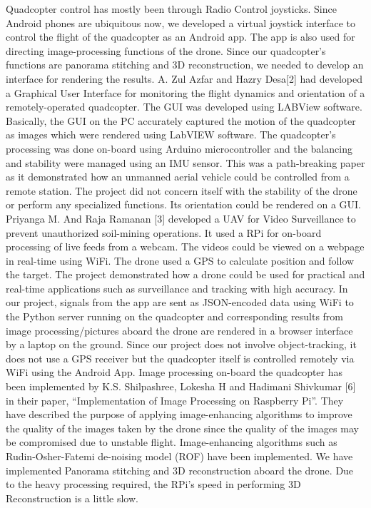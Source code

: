 Quadcopter control has mostly been through Radio Control joysticks. Since Android phones are ubiquitous now, we developed a virtual joystick interface to control the flight of the quadcopter as an Android app. The app is also used for directing image-processing functions of the drone. Since our quadcopter's functions are panorama stitching and 3D reconstruction, we needed to develop an interface for rendering the results.  A. Zul Azfar and Hazry Desa[2] had developed a Graphical User Interface for monitoring the flight dynamics and orientation of a remotely-operated quadcopter. The GUI was developed using LABView software. Basically, the GUI on the PC accurately captured the motion of the quadcopter as images which were rendered using LabVIEW software. The quadcopter’s processing was done on-board using Arduino microcontroller and the balancing and stability were managed using an IMU sensor. This was a path-breaking paper as it demonstrated how an unmanned aerial vehicle could be controlled from a remote station. The project did not concern itself with the stability of the drone or perform any specialized functions. Its orientation could be rendered on a GUI. Priyanga M. And Raja Ramanan [3] developed a UAV for Video Surveillance to prevent unauthorized soil-mining operations. It used a RPi for on-board processing of live feeds from a webcam. The videos could be viewed on a webpage in real-time using WiFi. The drone used a GPS to calculate position and follow the target. The project demonstrated how a drone could be used for practical and real-time applications such as surveillance and tracking with high accuracy. In our project, signals from the app are sent as JSON-encoded data using WiFi to the Python server running on the quadcopter and corresponding results from image processing/pictures aboard the drone are rendered in a browser interface by a laptop on the ground. Since our project does not involve object-tracking, it does not use a GPS receiver but the quadcopter itself is controlled remotely via WiFi using the Android App.
Image processing on-board the quadcopter has been implemented by K.S. Shilpashree, Lokesha H and Hadimani Shivkumar [6] in their paper, “Implementation of Image Processing on Raspberry Pi”. They have described the purpose of applying image-enhancing algorithms to improve the quality of the images taken by the drone since the quality of the images may be compromised due to unstable flight. Image-enhancing algorithms such as Rudin-Osher-Fatemi de-noising model (ROF) have been implemented. 
We have implemented Panorama stitching and 3D reconstruction aboard the drone. Due to the heavy processing required, the RPi's speed in performing 3D Reconstruction is a little slow. \newline
